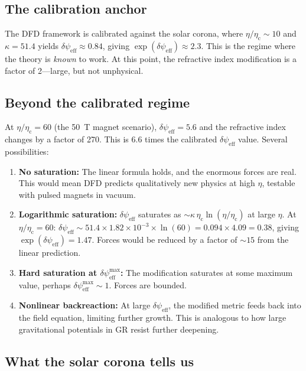 \documentclass[12pt,a4paper]{article}
\newcommand{\psieff}{\psi_{\mathrm{eff}}}
\newcommand{\etac}{\eta_{\mathrm{c}}}
\begin{document}
\subsection{The calibration anchor}

The DFD framework is calibrated against the solar corona, where $\eta/\etac \sim 10$ and $\kappa = 51.4$
yields $\delta\psieff \approx 0.84$, giving $\exp(\delta\psieff) \approx 2.3$. This is the regime where
the theory is \emph{known} to work. At this point, the refractive index modification is a factor of 2---large,
but not unphysical.

\subsection{Beyond the calibrated regime}

At $\eta/\etac = 60$ (the 50~T magnet scenario), $\delta\psieff = 5.6$ and the refractive index changes
by a factor of 270. This is 6.6 times the calibrated $\delta\psieff$ value. Several possibilities:

\begin{enumerate}
\item \textbf{No saturation:} The linear formula holds, and the enormous forces are real. This would
      mean DFD predicts qualitatively new physics at high $\eta$, testable with pulsed magnets in vacuum.

\item \textbf{Logarithmic saturation:} $\delta\psieff$ saturates as $\sim \kappa\,\etac\ln(\eta/\etac)$
      at large $\eta$. At $\eta/\etac = 60$: $\delta\psieff \sim 51.4 \times 1.82 \times 10^{-3} \times
      \ln(60) = 0.094 \times 4.09 = 0.38$, giving $\exp(\delta\psieff) = 1.47$. Forces would be
      reduced by a factor of $\sim 15$ from the linear prediction.

\item \textbf{Hard saturation at $\delta\psieff^{\max}$:} The modification saturates at some maximum
      value, perhaps $\delta\psieff^{\max} \sim 1$. Forces are bounded.

\item \textbf{Nonlinear backreaction:} At large $\delta\psieff$, the modified metric feeds back into
      the field equation, limiting further growth. This is analogous to how large gravitational potentials
      in GR resist further deepening.
\end{enumerate}

\subsection{What the solar corona tells us}
\end{document}
